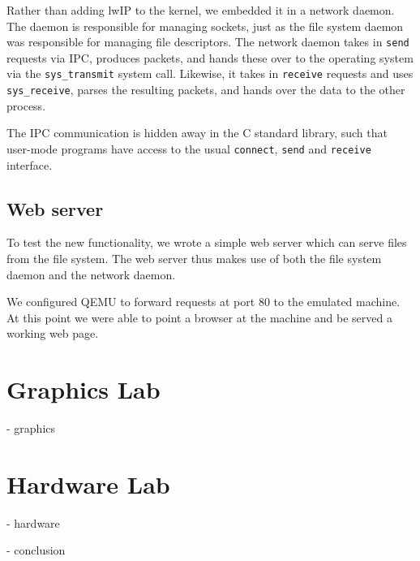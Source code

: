 \documentclass{article}
\begin{document}
Rather than adding lwIP to the kernel, we embedded it in a network daemon. The
daemon is responsible for managing sockets, just as the file system daemon was
responsible for managing file descriptors. The network daemon takes in
\texttt{send} requests via IPC, produces packets, and hands these over to the
operating system via the \texttt{sys\_transmit} system call. Likewise, it
takes in \texttt{receive} requests and uses \texttt{sys\_receive}, parses the
resulting packets, and hands over the data to the other process.

The IPC communication is hidden away in the C standard library, such that
user-mode programs have access to the usual \texttt{connect}, \texttt{send}
and \texttt{receive} interface.



\subsection{Web server}
To test the new functionality, we wrote a simple web server which can serve
files from the file system. The web server thus makes use of both the file
system daemon and the network daemon. 

We configured QEMU to forward requests at port 80 to the emulated machine. At
this point we were able to point a browser at the machine and be served a
working web page.


\section{Graphics Lab}
- graphics

\section{Hardware Lab}
- hardware



- conclusion



\end{document}
